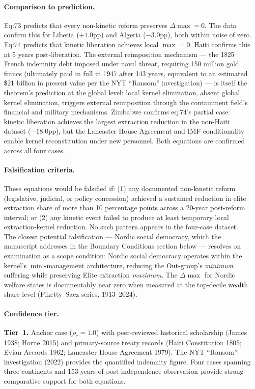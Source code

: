 \paragraph{Comparison to prediction.}
Eq:73 predicts that every non-kinetic reform preserves $\Delta\max = 0$. The data confirm this for Liberia ($+1.0$pp) and Algeria ($-3.0$pp), both within noise of zero. Eq:74 predicts that kinetic liberation achieves local $\max = 0$. Haiti confirms this at 5 years post-liberation. The external reimposition mechanism --- the 1825 French indemnity debt imposed under naval threat, requiring 150 million gold francs (ultimately paid in full in 1947 after 143 years, equivalent to an estimated \$21 billion in present value per the NYT ``Ransom'' investigation) --- is itself the theorem's prediction at the global level: local kernel elimination, absent global kernel elimination, triggers external reimposition through the containment field's financial and military mechanisms. Zimbabwe confirms eq:74's partial case: kinetic liberation achieves the largest extraction reduction in the non-Haiti dataset ($-18.0$pp), but the Lancaster House Agreement and IMF conditionality enable kernel reconstitution under new personnel. Both equations are confirmed across all four cases.

\paragraph{Falsification criteria.}
These equations would be falsified if: (1) any documented non-kinetic reform (legislative, judicial, or policy concession) achieved a sustained reduction in elite extraction share of more than 10 percentage points across a 20-year post-reform interval; or (2) any kinetic event failed to produce at least temporary local extraction-kernel reduction. No such pattern appears in the four-case dataset. The closest potential falsification --- Nordic social democracy, which the manuscript addresses in the Boundary Conditions section below --- resolves on examination as a scope condition: Nordic social democracy operates within the kernel's $\min$-management architecture, reducing the Out-group's \textit{minimum} suffering while preserving Elite extraction \textit{maximum}. The $\Delta\max$ for Nordic welfare states is documentably near zero when measured at the top-decile wealth share level (Piketty--Saez series, 1913--2024).

\paragraph{Confidence tier.}
\textbf{Tier~1.} Anchor case ($\rho_\tau = 1.0$) with peer-reviewed historical scholarship (James 1938; Horne 2015) and primary-source treaty records (Haiti Constitution 1805; Evian Accords 1962; Lancaster House Agreement 1979). The NYT ``Ransom'' investigation (2022) provides the quantified indemnity figure. Four cases spanning three continents and 153 years of post-independence observation provide strong comparative support for both equations.

